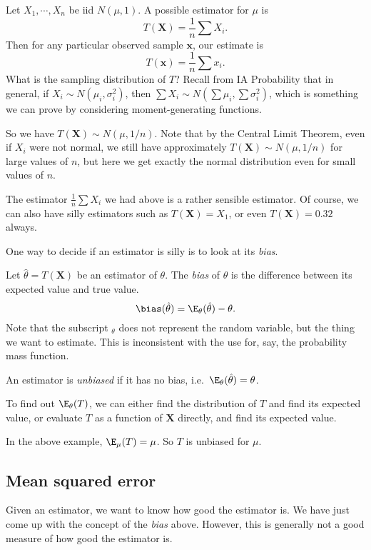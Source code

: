 \documentclass[a4paper]{article}
\begin{document}
\begin{eg}
  Let $X_1, \cdots, X_n$ be iid $N(\mu, 1)$. A possible estimator for $\mu$ is
  \[
    T(\mathbf{X}) = \frac{1}{n}\sum X_i.
  \]
  Then for any particular observed sample $\mathbf{x}$, our estimate is
  \[
    T(\mathbf{x}) = \frac{1}{n}\sum x_i.
  \]
  What is the sampling distribution of $T$? Recall from IA Probability that in general, if $X_i \sim N(\mu_i, \sigma_i^2)$, then $\sum X_i \sim N(\sum \mu_i, \sum \sigma_i^2)$, which is something we can prove by considering moment-generating functions.

  So we have $T(\mathbf{X})\sim N(\mu, 1/n)$. Note that by the Central Limit Theorem, even if $X_i$ were not normal, we still have approximately $T(\mathbf{X})\sim N(\mu, 1/n)$ for large values of $n$, but here we get exactly the normal distribution even for small values of $n$.
\end{eg}
The estimator $\frac{1}{n}\sum X_i$ we had above is a rather sensible estimator. Of course, we can also have silly estimators such as $T(\mathbf{X}) = X_1$, or even $T(\mathbf{X}) = 0.32$ always.

One way to decide if an estimator is silly is to look at its \emph{bias}.
\begin{defi}[Bias]
  Let $\hat{\theta} = T(\mathbf{X})$ be an estimator of $\theta$. The \emph{bias} of $\hat{\theta}$ is the difference between its expected value and true value.
  \[
    \bias(\hat{\theta}) = \E_\theta(\hat{\theta}) - \theta.
  \]
  Note that the subscript $_\theta$ does not represent the random variable, but the thing we want to estimate. This is inconsistent with the use for, say, the probability mass function.

  An estimator is \emph{unbiased} if it has no bias, i.e.\ $\E_\theta(\hat{\theta}) = \theta$.
\end{defi}
To find out $\E_\theta (T)$, we can either find the distribution of $T$ and find its expected value, or evaluate $T$ as a function of $\mathbf{X}$ directly, and find its expected value.

\begin{eg}
  In the above example, $\E_\mu(T) =\mu$. So $T$ is unbiased for $\mu$.
\end{eg}

\subsection{Mean squared error}
Given an estimator, we want to know how good the estimator is. We have just come up with the concept of the \emph{bias} above. However, this is generally not a good measure of how good the estimator is.
\end{document}
